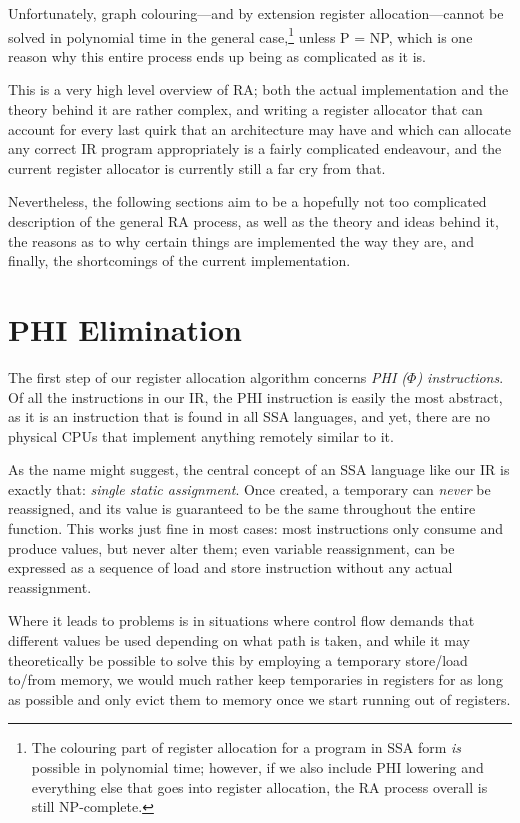 \documentclass[12pt]{report}
\begin{document}
Unfortunately, graph colouring—and by extension register allocation—cannot be solved in polynomial time in the general
case,\footnote{The colouring part of register allocation for a program in SSA form \textit{is} possible in polynomial time; however, if we
also include PHI lowering and everything else that goes into register allocation, the RA process overall is still NP-complete.} unless
P = NP, which is one reason why this entire process ends up being as complicated as it is.

This is a very high level overview of RA; both the actual implementation and the theory behind it are rather complex, and writing a register
allocator that can account for every last quirk that an architecture may have and which can allocate any correct IR program appropriately
is a fairly complicated endeavour, and the current register allocator is currently still a far cry from that.

Nevertheless, the following sections aim to be a hopefully not too complicated description of the general RA process, as well as the theory
and ideas behind it, the reasons as to why certain things are implemented the way they are, and finally, the shortcomings of the current
implementation.

\section{PHI Elimination}
The first step of our register allocation algorithm concerns \textit{PHI ($\Phi$) instructions}. Of all the instructions in our IR, the PHI
instruction is easily the most abstract, as it is an instruction that is found in all SSA languages, and yet, there are no physical CPUs
that implement anything remotely similar to it.

As the name might suggest, the central concept of an SSA language like our IR is exactly that: \textit{single static assignment}. Once
created, a temporary can \textit{never} be reassigned, and its value is guaranteed to be the same throughout the entire function. This
works just fine in most cases: most instructions only consume and produce values, but never alter them; even variable reassignment,
can be expressed as a sequence of load and store instruction without any actual reassignment.

Where it leads to problems is in situations where control flow demands that different values be used depending on what path is taken,
and while it may theoretically be possible to solve this by employing a temporary store/load to/from memory, we would much rather keep
temporaries in registers for as long as possible and only evict them to memory once we start running out of registers.
\end{document}
